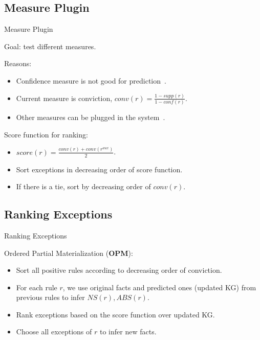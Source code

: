 \documentclass{beamer}
\begin{document}
\subsection{Measure Plugin}

\begin{frame}{Measure Plugin}

Goal: test different measures.

Reasons:
\begin{itemize}
	\item Confidence measure is not good for prediction~\cite{ref1}.
	\item Current measure is conviction, $conv(r) = \frac{1 - supp(r)}{1 - conf(r)}$.
	\item {
		Other measures can be plugged in the system~\cite{ref2}.
		\pause
	}
\end{itemize}

Score function for ranking:
\begin{itemize}
	\item $score(r) = \frac{conv(r) + conv(r^{aux})}{2}$.
	\item Sort exceptions in decreasing order of score function.
	\item If there is a tie, sort by decreasing order of $conv(r)$.
\end{itemize}

\end{frame}

\subsection{Ranking Exceptions}

\begin{frame}{Ranking Exceptions}

Ordered Partial Materialization (\textbf{OPM}):
\begin{itemize}
	\item Sort all positive rules according to decreasing order of conviction.
	\item For each rule $r$, we use original facts and predicted ones (updated KG) from previous rules to infer $NS(r), ABS(r)$.
	\item Rank exceptions based on the score function over updated KG.
	\item Choose all exceptions of $r$ to infer new facts.
\end{itemize}

\end{frame}
\end{document}
